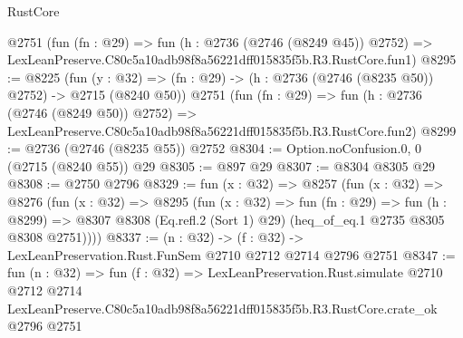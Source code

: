 \begin{lexlean}{RustCore}
\begin{coremodule}
    @2751
    (fun (fn : @29) =>
    fun (h : @2736 (@2746 (@8249 @45)) @2752) =>
    LexLeanPreserve.C80c5a10adb98f8a56221dff015835f5b.R3.RustCore.fun1)
@8295 := @8225
    (fun (y : @32) => (fn : @29) -> (h : @2736 (@2746 (@8235 @50)) @2752) -> @2715 (@8240 @50))
    @2751
    (fun (fn : @29) =>
    fun (h : @2736 (@2746 (@8249 @50)) @2752) =>
    LexLeanPreserve.C80c5a10adb98f8a56221dff015835f5b.R3.RustCore.fun2)
@8299 := @2736 (@2746 (@8235 @55)) @2752
@8304 := Option.noConfusion.{0, 0} (@2715 (@8240 @55)) @29
@8305 := @897 @29
@8307 := @8304 @8305 @29
@8308 := @2750 @2796
@8329 := fun (x : @32) =>
  @8257
    (fun (x : @32) =>
    @8276
      (fun (x : @32) =>
      @8295
        (fun (x : @32) =>
        fun (fn : @29) =>
        fun (h : @8299) =>
        @8307 @8308 (Eq.refl.{2} (Sort 1) @29) (heq_of_eq.{1} @2735 @8305 @8308 @2751))))
@8337 := (n : @32) -> (f : @32) -> LexLeanPreservation.Rust.FunSem @2710 @2712 @2714 @2796 @2751
@8347 := fun (n : @32) =>
  fun (f : @32) =>
  LexLeanPreservation.Rust.simulate
    @2710
    @2712
    @2714
    LexLeanPreserve.C80c5a10adb98f8a56221dff015835f5b.R3.RustCore.crate_ok
    @2796
    @2751
\end{coremodule}
\end{lexlean}
